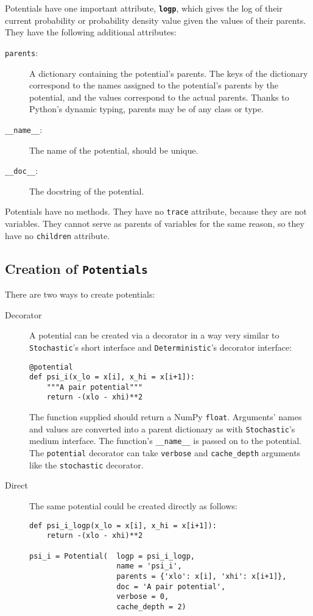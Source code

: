 \bigskip
Potentials have one important attribute, \texttt{\bfseries logp}, which gives the log of their current probability or probability density value given the values of their parents. They have the following additional attributes:
\begin{description}
    \item[\texttt{parents}:] A dictionary containing the potential's parents. The keys of the dictionary correspond to the names assigned to the potential's parents by the potential, and the values correspond to the actual parents. Thanks to Python's dynamic typing, parents may be of any class or type.
    \item[\texttt{__name__}:] The name of the potential, should be unique.
    \item[\texttt{__doc__}:] The docstring of the potential.
\end{description}
Potentials have no methods. They have no \texttt{trace} attribute, because they are not variables. They cannot serve as parents of variables for the same reason, so they have no \texttt{children} attribute.


\subsection*{Creation of \texttt{Potentials}}
There are two ways to create potentials:
\begin{description}
    \item[Decorator] A potential can be created via a decorator in a way very similar to \texttt{Stochastic}'s short interface and \texttt{Deterministic}'s decorator interface:
\begin{verbatim}
@potential
def psi_i(x_lo = x[i], x_hi = x[i+1]):
    """A pair potential"""
    return -(xlo - xhi)**2
\end{verbatim}
The function supplied should return a NumPy \texttt{float}. Arguments' names and values are converted into a parent dictionary as with \texttt{Stochastic}'s medium interface. The function's \texttt{__name__} is passed on to the potential. The \texttt{potential} decorator can take \texttt{verbose} and \texttt{cache_depth} arguments like the \texttt{stochastic} decorator.
    \item[Direct] The same potential could be created directly as follows:
\begin{verbatim}
def psi_i_logp(x_lo = x[i], x_hi = x[i+1]):
    return -(xlo - xhi)**2
        
psi_i = Potential(  logp = psi_i_logp, 
                    name = 'psi_i',
                    parents = {'xlo': x[i], 'xhi': x[i+1]},
                    doc = 'A pair potential',
                    verbose = 0,
                    cache_depth = 2)
\end{verbatim}
\end{description}


